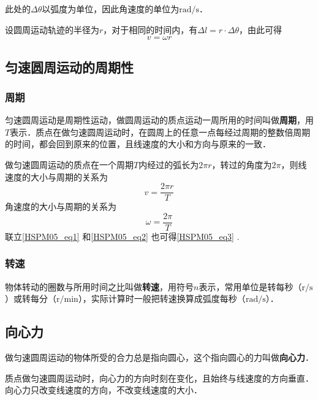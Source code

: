 此处的$\Delta \theta$以弧度为单位，因此角速度的单位为$\mathrm{rad/s}$．

设圆周运动轨迹的半径为$r$，对于相同的时间内，有$\Delta l=r \cdot \Delta \theta$，由此可得
\begin{equation}\label{HSPM05_eq3}
v=\omega r
\end{equation}

\subsection{匀速圆周运动的周期性}

\subsubsection{周期}

匀速圆周运动是周期性运动，做圆周运动的质点运动一周所用的时间叫做\textbf{周期}，用$T$表示．质点在做匀速圆周运动时，在圆周上的任意一点每经过周期的整数倍周期的时间，都会回到原来的位置，且线速度的大小和方向与原来的一致．

做匀速圆周运动的质点在一个周期$T$内经过的弧长为$2\pi r$，转过的角度为$2\pi$，则线速度的大小与周期的关系为
\begin{equation}\label{HSPM05_eq1}
v=\frac{2\pi r}{T}
\end{equation}
角速度的大小与周期的关系为
\begin{equation}\label{HSPM05_eq2}
\omega = \frac{2\pi}{T}
\end{equation}
联立\autoref{HSPM05_eq1} 和\autoref{HSPM05_eq2} 也可得\autoref{HSPM05_eq3} .

\subsubsection{转速}

物体转动的圈数与所用时间之比叫做\textbf{转速}，用符号$n$表示，常用单位是转每秒（$\mathrm{r/s}$）或转每分（$\mathrm{r/min}$），实际计算时一般把转速换算成弧度每秒（$\mathrm{rad/s}$）．

\subsection{向心力}

做匀速圆周运动的物体所受的合力总是指向圆心，这个指向圆心的力叫做\textbf{向心力}．

质点做匀速圆周运动时，向心力的方向时刻在变化，且始终与线速度的方向垂直．向心力只改变线速度的方向，不改变线速度的大小．

